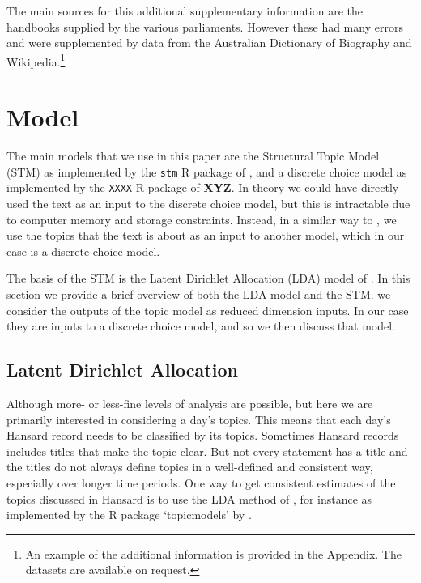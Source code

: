 \documentclass[12pt,]{article}
\theoremstyle{definition}
\theoremstyle{definition}
\theoremstyle{definition}
\theoremstyle{remark}
\begin{document}
The main sources for this additional supplementary information are the
handbooks supplied by the various parliaments. However these had many
errors and were supplemented by data from the Australian Dictionary of
Biography and Wikipedia.\footnote{An example of the additional
  information is provided in the Appendix. The datasets are available on
  request.}

\section{Model}\label{model}

The main models that we use in this paper are the Structural Topic Model
(STM) as implemented by the \texttt{stm} R package of
\citet{RobertsStewartAiroldiRPackage}, and a discrete choice model as
implemented by the \texttt{XXXX} R package of \textbf{XYZ}. In theory we
could have directly used the text as an input to the discrete choice
model, but this is intractable due to computer memory and storage
constraints. Instead, in a similar way to \citet{MuellerRauh2018}, we
use the topics that the text is about as an input to another model,
which in our case is a discrete choice model.

The basis of the STM is the Latent Dirichlet Allocation (LDA) model of
\citet{Blei2003latent}. In this section we provide a brief overview of
both the LDA model and the STM. we consider the outputs of the topic
model as reduced dimension inputs. In our case they are inputs to a
discrete choice model, and so we then discuss that model.

\subsection{Latent Dirichlet
Allocation}\label{latent-dirichlet-allocation}

Although more- or less-fine levels of analysis are possible, but here we
are primarily interested in considering a day's topics. This means that
each day's Hansard record needs to be classified by its topics.
Sometimes Hansard records includes titles that make the topic clear. But
not every statement has a title and the titles do not always define
topics in a well-defined and consistent way, especially over longer time
periods. One way to get consistent estimates of the topics discussed in
Hansard is to use the LDA method of \citet{Blei2003latent}, for instance
as implemented by the R package `topicmodels' by \citet{Grun2011}.
\end{document}

